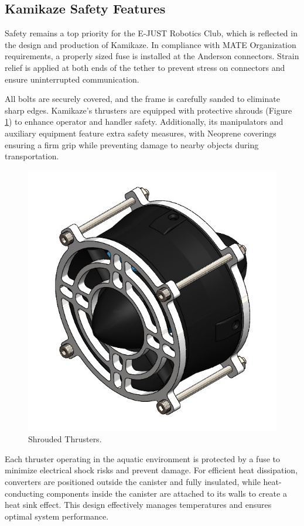 \subsection{Kamikaze Safety Features}

Safety remains a top priority for the E-JUST Robotics Club, which is reflected in the design and production of Kamikaze. In compliance with MATE Organization requirements, a properly sized fuse is installed at the Anderson connectors. Strain relief is applied at both ends of the tether to prevent stress on connectors and ensure uninterrupted communication.

All bolts are securely covered, and the frame is carefully sanded to eliminate sharp edges. Kamikaze’s thrusters are equipped with protective shrouds (Figure \ref{fig:shrouds}) to enhance operator and handler safety. Additionally, its manipulators and auxiliary equipment feature extra safety measures, with Neoprene coverings ensuring a firm grip while preventing damage to nearby objects during transportation.

\begin{figure}[h]
    \centering
    \includegraphics[width=0.6\columnwidth]{Sections/3Safety/images/shrouded_thruster.jpeg}
    \caption{Shrouded Thrusters.}
    \label{fig:shrouds}
\end{figure}

Each thruster operating in the aquatic environment is protected by a fuse to minimize electrical shock risks and prevent damage. For efficient heat dissipation, converters are positioned outside the canister and fully insulated, while heat-conducting components inside the canister are attached to its walls to create a heat sink effect. This design effectively manages temperatures and ensures optimal system performance.
